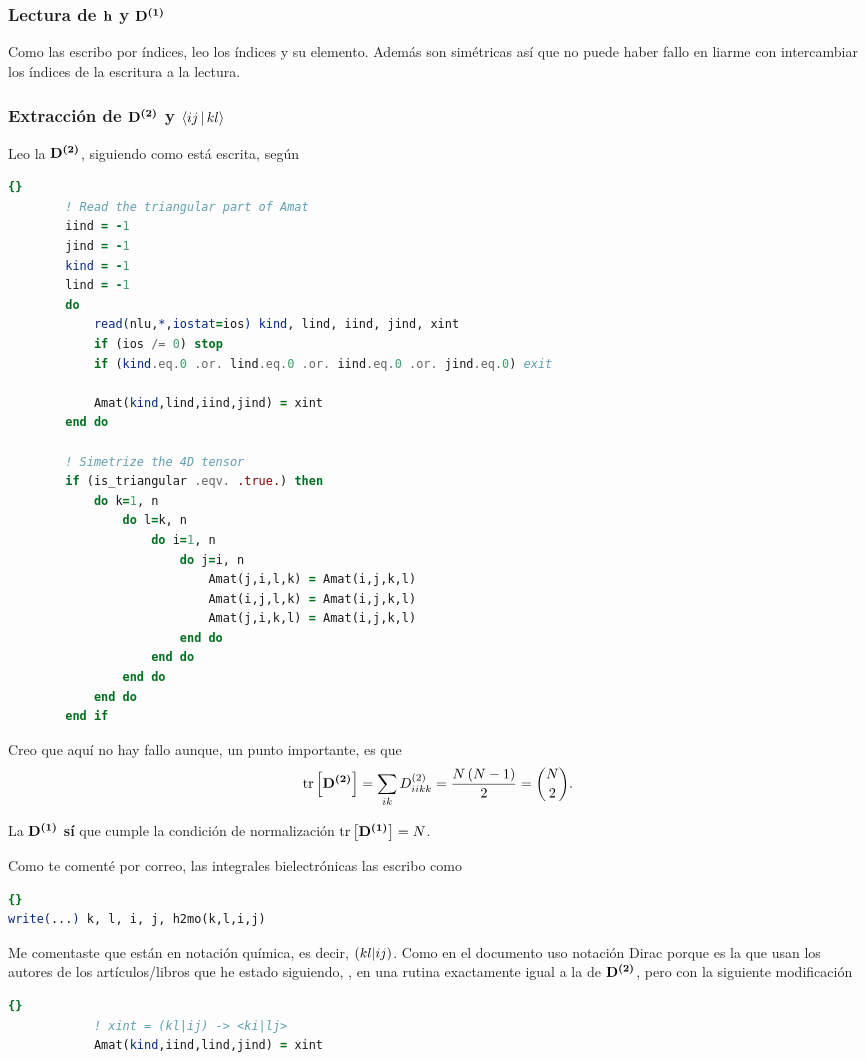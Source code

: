 \subsubsection{Lectura de $\boldsymbol{\mathrm{h}}$ y $\boldsymbol{\mathrm{D^{(1)}}}$} %
Como las escribo por índices, leo los índices y su elemento.
Además son simétricas así que no puede haber fallo en liarme con intercambiar
los índices de la escritura a la lectura.

\subsubsection{Extracción de $\boldsymbol{\mathrm{D^{(2)}}}$ y $\Braket{ij | kl}$} %
Leo la $\boldsymbol{\mathrm{D^{(2)}}}$, siguiendo como está escrita, según
\begin{lstlisting}[language=fortran]{}
        ! Read the triangular part of Amat
        iind = -1
        jind = -1
        kind = -1
        lind = -1
        do
            read(nlu,*,iostat=ios) kind, lind, iind, jind, xint
            if (ios /= 0) stop
            if (kind.eq.0 .or. lind.eq.0 .or. iind.eq.0 .or. jind.eq.0) exit

            Amat(kind,lind,iind,jind) = xint
        end do

        ! Simetrize the 4D tensor
        if (is_triangular .eqv. .true.) then
            do k=1, n
                do l=k, n
                    do i=1, n
                        do j=i, n
                            Amat(j,i,l,k) = Amat(i,j,k,l)
                            Amat(i,j,l,k) = Amat(i,j,k,l)
                            Amat(j,i,k,l) = Amat(i,j,k,l)
                        end do
                    end do
                end do
            end do
        end if
\end{lstlisting}
Creo que aquí no hay fallo aunque, un punto importante, es que  
\begin{equation}
    \trace \left[ \mat{D^{(2)}} \right] =
    \sum_{ik}  D^{(2)}_{iikk} =
    \frac{N\left( N-1 \right)}{2} =
    \binom{N}{2}
    .
\end{equation}

La $\boldsymbol{\mathrm{D^{(1)}}}$ \textbf{sí} que cumple la condición de normalización
$\trace \left[ \mat{D^{(1)}} \right] = N$.

Como te comenté por correo, las integrales bielectrónicas las escribo como
\begin{lstlisting}[language=fortran]{}
write(...) k, l, i, j, h2mo(k,l,i,j)
\end{lstlisting}
Me comentaste que están en notación química, es decir, $\mathinner{\left({kl | ij}\right)}$.
Como en el documento uso notación Dirac porque es la que usan los autores
de los artículos/libros que he estado siguiendo, , en una rutina exactamente igual a la
de $\boldsymbol{\mathrm{D^{(2)}}}$, pero con la siguiente modificación
\begin{lstlisting}[language=fortran]{}
            ! xint = (kl|ij) -> <ki|lj>
            Amat(kind,iind,lind,jind) = xint
\end{lstlisting}

